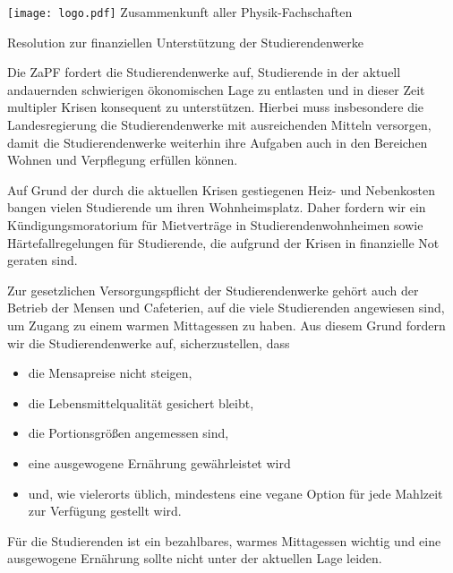 \documentclass[DIV=calc]{scrartcl}
\begin{document}
\hspace{0.87\textwidth}
\begin{minipage}{120pt}
	\vspace{-1.8cm}
	\texttt{[image: logo.pdf]}
	\centering
	\small Zusammenkunft aller Physik-Fachschaften
\end{minipage}

\begin{center}
  \huge{Resolution zur finanziellen Unterstützung der
Studierendenwerke}\vspace{.25\baselineskip}\\
  \normalsize
\end{center}
\vspace{1cm}

Die ZaPF fordert die Studierendenwerke auf, Studierende in der aktuell andauernden schwierigen ökonomischen Lage zu entlasten und in dieser Zeit multipler Krisen konsequent zu unterstützen. Hierbei muss insbesondere die Landesregierung die Studierendenwerke mit ausreichenden Mitteln versorgen, damit die Studierendenwerke weiterhin ihre Aufgaben auch in den Bereichen Wohnen und Verpflegung erfüllen können.

Auf Grund der durch die aktuellen Krisen gestiegenen Heiz- und Nebenkosten bangen vielen Studierende um ihren Wohnheimsplatz. Daher fordern wir ein Kündigungsmoratorium für Mietverträge in Studierendenwohnheimen sowie Härtefallregelungen für Studierende, die aufgrund der Krisen in finanzielle Not geraten sind.

Zur gesetzlichen Versorgungspflicht der Studierendenwerke gehört auch der Betrieb der Mensen und Cafeterien, auf die viele Studierenden angewiesen sind, um Zugang zu einem warmen Mittagessen zu haben.
Aus diesem Grund fordern wir die Studierendenwerke auf, sicherzustellen, dass
\begin{itemize}
    \item die Mensapreise nicht steigen,
    \item die Lebensmittelqualität gesichert bleibt,
    \item die Portionsgrößen angemessen sind,
    \item eine ausgewogene Ernährung gewährleistet wird
    \item und, wie vielerorts üblich, mindestens eine vegane Option für jede Mahlzeit zur Verfügung gestellt wird.
\end{itemize}
Für die Studierenden ist ein bezahlbares, warmes Mittagessen wichtig und eine ausgewogene Ernährung sollte nicht unter der aktuellen Lage leiden.
\end{document}
